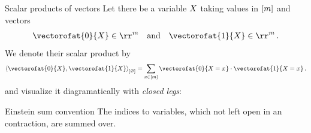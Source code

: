 \documentclass{beamer}
\begin{document}
    \begin{frame}{Scalar products of vectors}
        Let there be a variable $X$ taking values in $[m]$ and vectors
        \begin{align*}
            \vectorofat{0}{\catvariable}\in\rr^{\catdim} \quad \text{and}\quad\vectorofat{1}{\catvariable}\in\rr^{\catdim} \, .
        \end{align*}
        We denote their scalar product by %
        \begin{align*}
            \contraction{\vectorofat{0}{\catvariable},\vectorofat{1}{\catvariable}}
            = \sum_{\catindexin} \vectorofat{0}{\indexedcatvariable} \cdot \vectorofat{1}{\indexedcatvariable} \, .
        \end{align*}
        and visualize it diagramatically with \emph{closed legs}:
        \begin{block}{Einstein sum convention}
            The indices to variables, which not left open in an contraction, are summed over.
        \end{block}
    \end{frame}
\end{document}
